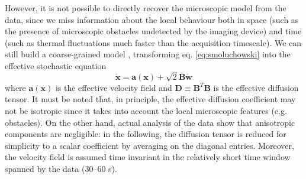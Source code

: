 However, it is not possible to directly recover the microscopic model from the  data, since we miss information about the local behaviour both in space (such as the presence of microscopic obstacles undetected by the imaging device) and time (such as thermal fluctuations much faster than the acquisition timescale). We can still build a coarse-grained model , transforming eq. \ref{eq:smoluchowski} into the effective stochastic equation
\begin{equation} \label{eq:effective}
 \dot{\bm{x}} = \bm{a}(\bm{x}) + \sqrt{2}\bm{B} \dot{\bm{w}}
\end{equation}
where $\bm{a}(\bm{x})$ is the effective velocity field and $\bm{D} \equiv \bm{B}^T\bm{B}$ is the effective diffusion tensor. It must be noted that, in principle, the effective diffusion coefficient may not be isotropic since it takes into account the local microscopic features (e.g. obstacles). On the other hand, actual analysis of the data show that anisotropic components are negligible: in the following, the diffusion tensor is reduced for simplicity to a scalar coefficient by averaging on the diagonal entries. Moreover, the velocity field is assumed time invariant in the relatively short time window spanned by the  data (30--60 s).



